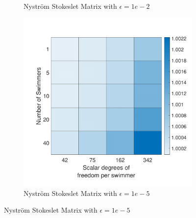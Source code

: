 \begin{figure}[hb]
\begin{subfigure}{0.3\textwidth}
        \caption{Nyström Stokeslet Matrix with $\epsilon=1e-2$}
    \end{subfigure}
    \begin{subfigure}{0.3\textwidth}
        \includegraphics[width=\linewidth]{Images/Condition/Stokeslet Matrix-5.pdf}
        \caption{Nyström Stokeslet Matrix with $\epsilon=1e-5$}
    \end{subfigure}
\end{figure}
